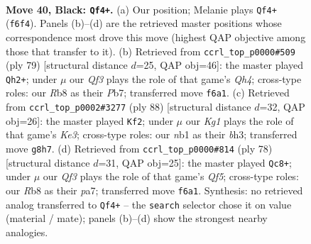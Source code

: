 \documentclass[11pt]{article}
\begin{document}
\clearpage

\begin{figure}[p]\centering
\begin{subfigure}{0.46\textwidth}\centering
\resizebox{\linewidth}{!}{%
\newchessgame
\chessboard[
  setfen={1r4k1/2p2p2/5q2/2Q3P1/2P1P2K/8/8/1N6 b - - 0 40},
  showmover=false,
  pgfstyle=straightmove, color=movearrow, markmove={f6-f4}
]}
\caption{}
\end{subfigure}\hfill
\begin{subfigure}{0.46\textwidth}\centering
\resizebox{\linewidth}{!}{%
\newchessgame
\chessboard[
  setfen={5k2/1p3p2/3P4/7q/p5P1/8/1P3K2/3Q4 b - - 0 40},
  showmover=false,
  pgfstyle=straightmove, color=movearrow, markmove={h5-h2}
]}
\caption{}
\end{subfigure}
\\[4pt]
\begin{subfigure}{0.46\textwidth}\centering
\resizebox{\linewidth}{!}{%
\newchessgame
\chessboard[
  setfen={8/p4Qpk/7p/4q3/8/4KP1b/P7/1R6 w - - 1 45},
  showmover=false,
  pgfstyle=straightmove, color=movearrow, markmove={e3-f2}
]}
\caption{}
\end{subfigure}\hfill
\begin{subfigure}{0.46\textwidth}\centering
\resizebox{\linewidth}{!}{%
\newchessgame
\chessboard[
  setfen={6k1/p5p1/8/3qpQ2/8/1P4K1/P4P2/8 w - - 9 40},
  showmover=false,
  pgfstyle=straightmove, color=movearrow, markmove={f5-c8}
]}
\caption{}
\end{subfigure}
\caption{\textbf{Move 40, Black: \texttt{Qf4+}.} (a) Our position; Melanie plays \texttt{Qf4+} (\texttt{f6f4}). Panels (b)--(d) are the retrieved master positions whose correspondence most drove this move (highest QAP objective among those that transfer to it). (b) Retrieved from \texttt{ccrl\_top\_p0000\#509} (ply 79) [structural distance $d$=25, QAP obj=46]: the master played \texttt{Qh2+}; under $\mu$ our \emph{Qf3} plays the role of that game's \emph{Qh4}; cross-type roles: our \emph{R}b8 as their \emph{P}b7; transferred move \texttt{f6a1}. (c) Retrieved from \texttt{ccrl\_top\_p0002\#3277} (ply 88) [structural distance $d$=32, QAP obj=26]: the master played \texttt{Kf2}; under $\mu$ our \emph{Kg1} plays the role of that game's \emph{Ke3}; cross-type roles: our \emph{n}b1 as their \emph{b}h3; transferred move \texttt{g8h7}. (d) Retrieved from \texttt{ccrl\_top\_p0000\#814} (ply 78) [structural distance $d$=31, QAP obj=25]: the master played \texttt{Qc8+}; under $\mu$ our \emph{Qf3} plays the role of that game's \emph{Qf5}; cross-type roles: our \emph{R}b8 as their \emph{p}a7; transferred move \texttt{f6a1}. Synthesis: no retrieved analog transferred to \texttt{Qf4+} -- the \texttt{search} selector chose it on value (material / mate); panels (b)--(d) show the strongest nearby analogies.}
\label{fig:thought-m79}
\end{figure}
\end{document}
